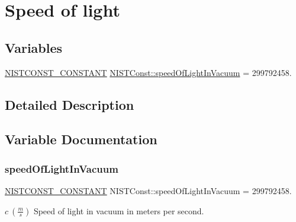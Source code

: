 \hypertarget{group___n_i_s_t_const-_speed_of_light}{}\section{Speed of light}
\label{group___n_i_s_t_const-_speed_of_light}
\subsection*{Variables}
\begin{DoxyCompactItemize}
\item 
\mbox{\hyperlink{_n_i_s_t_const_8hpp_a2b0fc1d7452373f816175dd86ce26729}{N\+I\+S\+T\+C\+O\+N\+S\+T\+\_\+\+C\+O\+N\+S\+T\+A\+NT}} \mbox{\hyperlink{group___n_i_s_t_const-_speed_of_light_ga5b7c240e787216aab4b730470074888e}{N\+I\+S\+T\+Const\+::speed\+Of\+Light\+In\+Vacuum}} = 299792458.
\end{DoxyCompactItemize}


\subsection{Detailed Description}


\subsection{Variable Documentation}
\mbox{\label{group___n_i_s_t_const-_speed_of_light_ga5b7c240e787216aab4b730470074888e}} 
\subsubsection{\texorpdfstring{speed\+Of\+Light\+In\+Vacuum}{speedOfLightInVacuum}}
{\footnotesize\ttfamily \mbox{\hyperlink{_n_i_s_t_const_8hpp_a2b0fc1d7452373f816175dd86ce26729}{N\+I\+S\+T\+C\+O\+N\+S\+T\+\_\+\+C\+O\+N\+S\+T\+A\+NT}} N\+I\+S\+T\+Const\+::speed\+Of\+Light\+In\+Vacuum = 299792458.}

$c \ (\frac{m}{s})$ Speed of light in vacuum in meters per second. 